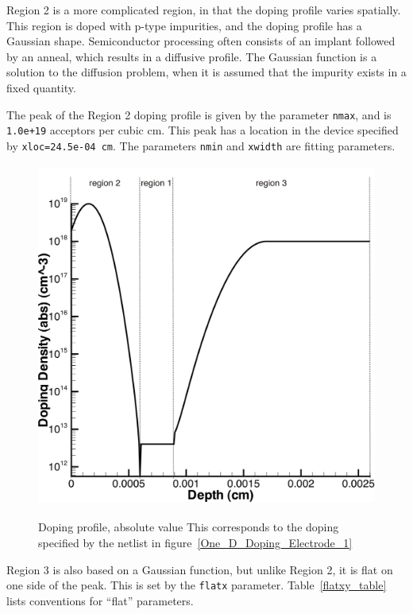 Region 2 is a more complicated region, in that the doping profile varies
spatially.  This region is doped with p-type impurities, and the doping profile has a Gaussian
shape.  Semiconductor processing often consists of an implant followed by
an anneal, which results in a diffusive profile.  The Gaussian function 
is a solution to the diffusion problem, when it is assumed that the 
impurity exists in a fixed quantity.  

The peak of the Region 2 doping profile is given by the parameter \texttt{nmax}, 
and is \texttt{1.0e+19} acceptors per cubic cm. This peak has a location in the 
device specified by \texttt{xloc=24.5e-04 cm}.  The parameters \texttt{nmin} and 
\texttt{xwidth} are fitting parameters.

\begin{figure}
  \centering
  \scalebox{0.7}
  {\includegraphics[width=4.610in,height= 4.45in]{doping_log}}
  \caption[Doping profile, absolute value]{Doping profile, absolute value  
This corresponds to the doping specified by the netlist in figure~\ref{One_D_Doping_Electrode_1}\label{Doping_Profile_1D}}
\end{figure}

Region 3 is also based on a Gaussian function, but unlike Region 2, it is 
flat on one side of the peak.  This is set by the \texttt{flatx} parameter.  
Table~\ref{flatxy_table} lists conventions for ``flat'' parameters.


